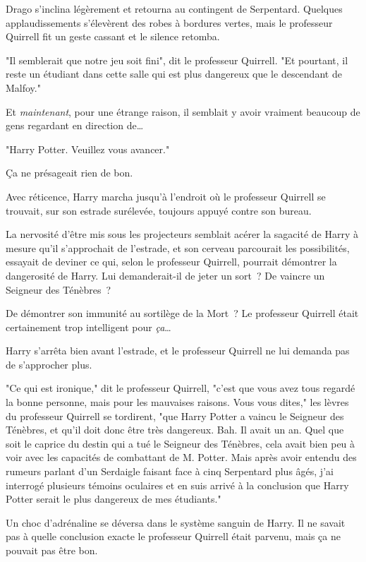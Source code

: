 Drago s'inclina légèrement et retourna au contingent de Serpentard. Quelques applaudissements s'élevèrent des robes à bordures vertes, mais le professeur Quirrell fit un geste cassant et le silence retomba.

"Il semblerait que notre jeu soit fini", dit le professeur Quirrell. "Et pourtant, il reste un étudiant dans cette salle qui est plus dangereux que le descendant de Malfoy."

Et \emph{maintenant}, pour une étrange raison, il semblait y avoir vraiment beaucoup de gens regardant en direction de…

"Harry Potter. Veuillez vous avancer."

Ça ne présageait rien de bon.

Avec réticence, Harry marcha jusqu'à l'endroit où le professeur Quirrell se trouvait, sur son estrade surélevée, toujours appuyé contre son bureau.

La nervosité d'être mis sous les projecteurs semblait acérer la sagacité de Harry à mesure qu'il s'approchait de l'estrade, et son cerveau parcourait les possibilités, essayait de deviner ce qui, selon le professeur Quirrell, pourrait démontrer la dangerosité de Harry. Lui demanderait-il de jeter un sort~? De vaincre un Seigneur des Ténèbres~?

De démontrer son immunité au sortilège de la Mort~? Le professeur Quirrell était certainement trop intelligent pour \emph{ça}…

Harry s'arrêta bien avant l'estrade, et le professeur Quirrell ne lui demanda pas de s'approcher plus.

"Ce qui est ironique," dit le professeur Quirrell, "c'est que vous avez tous regardé la bonne personne, mais pour les mauvaises raisons. Vous vous dites," les lèvres du professeur Quirrell se tordirent, "que Harry Potter a vaincu le Seigneur des Ténèbres, et qu'il doit donc être très dangereux. Bah. Il avait un an. Quel que soit le caprice du destin qui a tué le Seigneur des Ténèbres, cela avait bien peu à voir avec les capacités de combattant de M. Potter. Mais après avoir entendu des rumeurs parlant d'un Serdaigle faisant face à cinq Serpentard plus âgés, j'ai interrogé plusieurs témoins oculaires et en suis arrivé à la conclusion que Harry Potter serait le plus dangereux de mes étudiants."

Un choc d'adrénaline se déversa dans le système sanguin de Harry. Il ne savait pas à quelle conclusion exacte le professeur Quirrell était parvenu, mais ça ne pouvait pas être bon.

